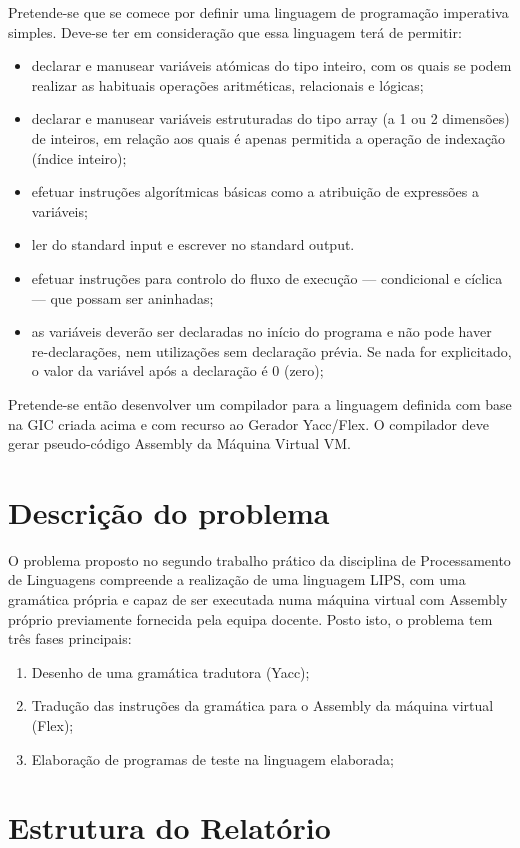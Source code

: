 \documentclass{report}
\begin{document}
Pretende-se que se comece por definir uma linguagem de programação imperativa simples.
Deve-se ter em consideração que essa linguagem terá de permitir:
\begin{itemize}
\item declarar e manusear variáveis atómicas do tipo inteiro, com os quais se podem realizar as habituais operações aritméticas, relacionais e lógicas;
\item declarar e manusear variáveis estruturadas do tipo array (a 1 ou 2 dimensões) de inteiros, em relação aos quais é apenas permitida a operação de indexação (índice inteiro);
\item efetuar instruções algorítmicas básicas como a atribuição de expressões a variáveis;
\item ler do standard input e escrever no standard output.
\item efetuar instruções para controlo do fluxo de execução — condicional e cíclica — que possam ser aninhadas;
\item as variáveis deverão ser declaradas no início do programa e não pode haver re-declarações, nem utilizações sem declaração prévia.  Se nada for explicitado, o valor da variável após a declaração é 0 (zero);
\end{itemize}
Pretende-se então desenvolver um compilador para a linguagem definida com base na GIC criada acima e com recurso ao Gerador Yacc/Flex.
O compilador deve gerar pseudo-código Assembly da Máquina Virtual VM.

\section*{Descrição do problema}
O problema proposto no segundo trabalho prático da disciplina de Processamento de Linguagens compreende a realização de uma linguagem LIPS, com uma gramática própria e capaz de ser executada numa máquina virtual com Assembly próprio previamente fornecida pela equipa docente.
Posto isto, o problema tem três fases principais:
\begin{enumerate}
\item Desenho de uma gramática tradutora (Yacc);
\item Tradução das instruções da gramática para o Assembly da máquina virtual (Flex);
\item Elaboração de programas de teste na linguagem elaborada;
\end{enumerate}


\section*{Estrutura do Relatório} \
\end{document}
